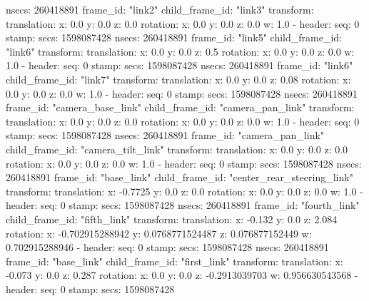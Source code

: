         nsecs: 260418891
      frame_id: "link2"
    child_frame_id: "link3"
    transform: 
      translation: 
        x: 0.0
        y: 0.0
        z: 0.0
      rotation: 
        x: 0.0
        y: 0.0
        z: 0.0
        w: 1.0
  - 
    header: 
      seq: 0
      stamp: 
        secs: 1598087428
        nsecs: 260418891
      frame_id: "link5"
    child_frame_id: "link6"
    transform: 
      translation: 
        x: 0.0
        y: 0.0
        z: 0.5
      rotation: 
        x: 0.0
        y: 0.0
        z: 0.0
        w: 1.0
  - 
    header: 
      seq: 0
      stamp: 
        secs: 1598087428
        nsecs: 260418891
      frame_id: "link6"
    child_frame_id: "link7"
    transform: 
      translation: 
        x: 0.0
        y: 0.0
        z: 0.08
      rotation: 
        x: 0.0
        y: 0.0
        z: 0.0
        w: 1.0
  - 
    header: 
      seq: 0
      stamp: 
        secs: 1598087428
        nsecs: 260418891
      frame_id: "camera_base_link"
    child_frame_id: "camera_pan_link"
    transform: 
      translation: 
        x: 0.0
        y: 0.0
        z: 0.0
      rotation: 
        x: 0.0
        y: 0.0
        z: 0.0
        w: 1.0
  - 
    header: 
      seq: 0
      stamp: 
        secs: 1598087428
        nsecs: 260418891
      frame_id: "camera_pan_link"
    child_frame_id: "camera_tilt_link"
    transform: 
      translation: 
        x: 0.0
        y: 0.0
        z: 0.0
      rotation: 
        x: 0.0
        y: 0.0
        z: 0.0
        w: 1.0
  - 
    header: 
      seq: 0
      stamp: 
        secs: 1598087428
        nsecs: 260418891
      frame_id: "base_link"
    child_frame_id: "center_rear_steering_link"
    transform: 
      translation: 
        x: -0.7725
        y: 0.0
        z: 0.0
      rotation: 
        x: 0.0
        y: 0.0
        z: 0.0
        w: 1.0
  - 
    header: 
      seq: 0
      stamp: 
        secs: 1598087428
        nsecs: 260418891
      frame_id: "fourth_link"
    child_frame_id: "fifth_link"
    transform: 
      translation: 
        x: -0.132
        y: 0.0
        z: 2.084
      rotation: 
        x: -0.702915288942
        y: 0.0768771524487
        z: 0.076877152449
        w: 0.702915288946
  - 
    header: 
      seq: 0
      stamp: 
        secs: 1598087428
        nsecs: 260418891
      frame_id: "base_link"
    child_frame_id: "first_link"
    transform: 
      translation: 
        x: -0.073
        y: 0.0
        z: 0.287
      rotation: 
        x: 0.0
        y: 0.0
        z: -0.2913039703
        w: 0.956630543568
  - 
    header: 
      seq: 0
      stamp: 
        secs: 1598087428
